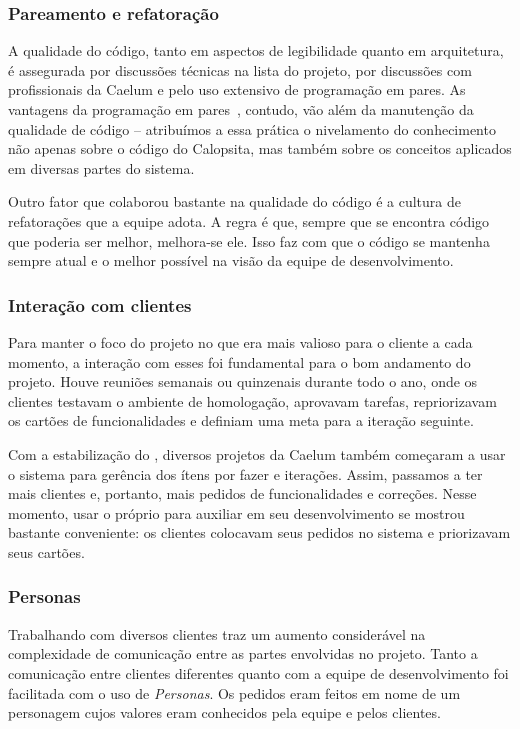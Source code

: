 \subsubsection*{Pareamento e refatoração}

A qualidade do código, tanto em aspectos de legibilidade quanto em arquitetura, é assegurada por discussões técnicas na lista do projeto, por discussões com profissionais da Caelum e pelo uso extensivo de programação em pares. As vantagens da programação em pares~\cite{pair}, contudo, vão além da manutenção da qualidade de código -- atribuímos a essa prática o nivelamento do conhecimento não apenas sobre o código do Calopsita, mas também sobre os conceitos aplicados em diversas partes do sistema.

Outro fator que colaborou bastante na qualidade do código é a cultura de refatorações que a equipe adota. A regra é que, sempre que se encontra código que poderia ser melhor, melhora-se ele. Isso faz com que o código se mantenha sempre atual e o melhor possível na visão da equipe de desenvolvimento.

\subsubsection*{Interação com clientes}

Para manter o foco do projeto no que era mais valioso para o cliente a cada momento, a interação com esses foi fundamental para o bom andamento do projeto. Houve reuniões semanais ou quinzenais durante todo o ano, onde os clientes testavam o \calopsita{} ambiente de homologação, aprovavam tarefas,  repriorizavam os cartões de funcionalidades e definiam uma meta para a iteração seguinte. 

Com a estabilização do \calopsita{}, diversos projetos da Caelum também começaram a usar o sistema para gerência dos ítens por fazer e iterações. Assim, passamos a ter mais clientes e, portanto, mais pedidos de funcionalidades e correções. Nesse momento, usar o próprio \calopsita{} para auxiliar em seu desenvolvimento se mostrou bastante conveniente: os clientes colocavam seus pedidos no sistema e priorizavam seus cartões.

\subsubsection*{Personas}

Trabalhando com diversos clientes traz um aumento considerável na complexidade de comunicação entre as partes envolvidas no projeto. Tanto a comunicação entre clientes diferentes quanto com a equipe de desenvolvimento foi facilitada com o uso de \textit{Personas}. Os pedidos eram feitos em nome de um personagem cujos valores eram conhecidos pela equipe e pelos clientes. 

